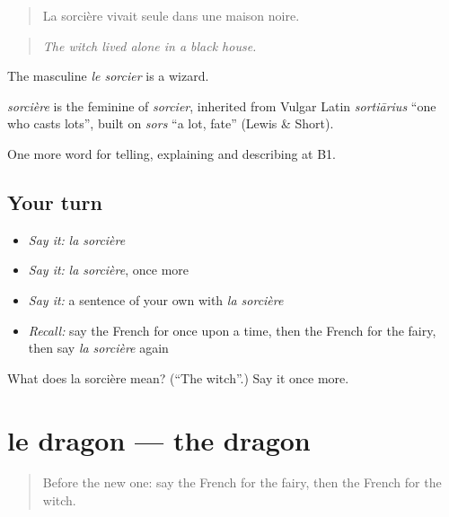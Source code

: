 \begin{quote}
La sorcière vivait seule dans une maison noire.
\end{quote}

\begin{quote}
\emph{The witch lived alone in a black house.}
\end{quote}

The masculine \emph{le sorcier} is a wizard.

\begin{cousinweb}
\emph{sorcière} is the feminine of \emph{sorcier}, inherited from Vulgar Latin \emph{sortiārius} \textquotedblleft{}one who casts lots\textquotedblright{}, built on \emph{sors} \textquotedblleft{}a lot, fate\textquotedblright{} (Lewis \& Short).
\end{cousinweb}

\begin{grammarlens}[title={What you've built}]
One more word for telling, explaining and describing at B1.
\end{grammarlens}

\subsection*{Your turn}
\begin{itemize}
\raggedright
  \item \emph{Say it:} \emph{la sorcière}
  \item \emph{Say it:} \emph{la sorcière}, once more
  \item \emph{Say it:} a sentence of your own with \emph{la sorcière}
  \item \emph{Recall:} say the French for once upon a time, then the French for the fairy, then say \emph{la sorcière} again
\end{itemize}

\begin{tcolorbox}[breakable,colback=teal!4,colframe=teal!35!black,title={Before you move on}]
What does la sorcière mean? (\textquotedblleft{}The witch\textquotedblright{}.) Say it once more.
\end{tcolorbox}
\section[le dragon]{le dragon — the dragon}

\label{lesson:FR-C321-dragon}



\begin{quote}
Before the new one: say the French for the fairy, then the French for the witch.
\end{quote}

